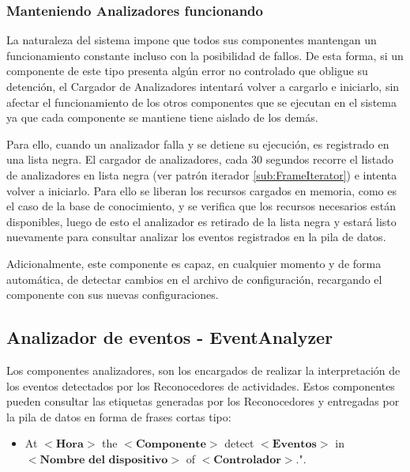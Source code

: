         \subsubsection{Manteniendo Analizadores funcionando}
        \label{sub2:AnalyzerKeepAlive}
            La naturaleza del sistema impone que todos sus componentes mantengan un funcionamiento constante incluso con la posibilidad de fallos. De esta forma, si un componente de este tipo presenta algún error no controlado que obligue su detención, el Cargador de Analizadores intentará volver a cargarlo e iniciarlo, sin afectar el funcionamiento de los otros componentes que se ejecutan en el sistema ya que cada componente se mantiene tiene aislado de los demás.
            
            Para ello, cuando un analizador falla y se detiene su ejecución, es registrado en una lista negra. El cargador de analizadores, cada 30 segundos recorre el listado de analizadores en lista negra (ver patrón iterador \ref{sub:FrameIterator}) e intenta volver a iniciarlo. Para ello se liberan los recursos cargados en memoria, como es el caso de la base de conocimiento, y se verifica que los recursos necesarios están disponibles, luego de esto el analizador es retirado de la lista negra y estará listo nuevamente para consultar analizar los eventos registrados en la pila de datos.
            
            Adicionalmente, este componente es capaz, en cualquier momento y de forma automática, de detectar cambios en el archivo de configuración, recargando el componente con sus nuevas configuraciones.
            
    \subsection{Analizador de eventos - EventAnalyzer}
    \label{sub:EventAnalyzer}
        Los componentes analizadores, son los encargados de realizar la interpretación de los eventos detectados por los Reconocedores de actividades. Estos componentes pueden consultar las etiquetas generadas por los Reconocedores y entregadas por la pila de datos en forma de frases cortas tipo: 
        
        \begin{itemize}
            \item At $<\textbf{Hora}>$ the $<\textbf{Componente}>$ detect $<\textbf{Eventos}>$ in $<\textbf{Nombre del dispositivo}>$ of $<\textbf{Controlador}>$.".
        \end{itemize}
        
